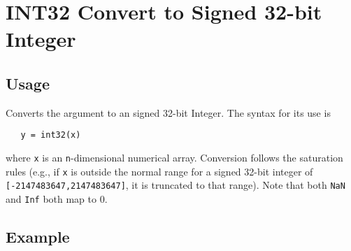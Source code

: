 \section{INT32 Convert to Signed 32-bit Integer}

\subsection{Usage}

Converts the argument to an signed 32-bit Integer.  The syntax
for its use is
\begin{verbatim}
   y = int32(x)
\end{verbatim}
where \verb|x| is an \verb|n|-dimensional numerical array.  Conversion
follows the saturation rules (e.g., if \verb|x| is outside the normal
range for a signed 32-bit integer of \verb|[-2147483647,2147483647]|, 
it is truncated to that range).  Note that both \verb|NaN| and \verb|Inf| both map to 0.
\subsection{Example}

